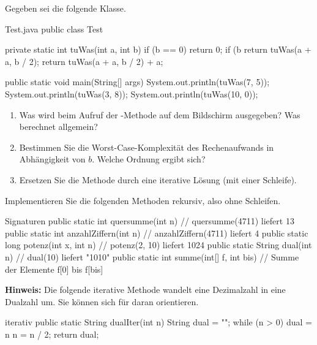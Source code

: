 Gegeben sei die folgende Klasse.
\begin{javacode}{Test.java}
public class Test {
	private static int tuWas(int a, int b) {
		if (b == 0)
			return 0;
		if (b %
			return tuWas(a + a, b / 2);
		return tuWas(a + a, b / 2) + a;
	}

	public static void main(String[] args) {
		System.out.println(tuWas(7, 5));
		System.out.println(tuWas(3, 8));
		System.out.println(tuWas(10, 0));
	}
}
\end{javacode}
\begin{enumerate}[label=\alph*)]
\item Was wird beim Aufruf der -Methode auf dem Bildschirm ausgegeben? Was berechnet  allgemein?
\item Bestimmen Sie die Worst-Case-Komplexität des Rechenaufwands in Abhängigkeit von $b$. Welche Ordnung ergibt sich?
\item Ersetzen Sie die Methode  durch eine iterative Lösung (mit einer Schleife).
\end{enumerate}

Implementieren Sie die folgenden Methoden rekursiv, also ohne Schleifen.
\begin{javacode}[Ausschnitt]{Signaturen}
public static int quersumme(int n)              // quersumme(4711) liefert 13
public static int anzahlZiffern(int n)          // anzahlZiffern(4711) liefert 4
public static long potenz(int x, int n)         // potenz(2, 10) liefert 1024
public static String dual(int n)                // dual(10) liefert "1010"
public static int summe(int[] f, int bis)       // Summe der Elemente f[0] bis f[bis]
\end{javacode}
\begin{hinweis}
\textbf{Hinweis:} Die folgende iterative Methode wandelt eine Dezimalzahl in eine Dualzahl um. Sie können sich für  daran orientieren.
\begin{javacode}[Ausschnitt]{iterativ}
public static String dualIter(int n) {
	String dual = "";
	while (n > 0) {
		dual = n %
		n = n / 2;
	}
	return dual;
}
\end{javacode}
\end{hinweis}

